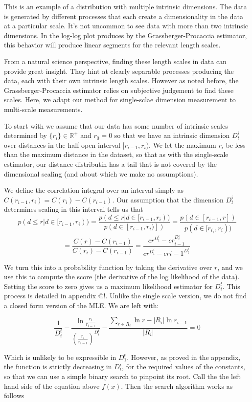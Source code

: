 \documentclass[10pt]{article}
\begin{document}
This is an example of a distribution with multiple intrinsic dimensions. The data is generated by different processes that each create a dimensionality in the data at a particular scale. It's not uncommon to see data with more than two intrinsic dimensions. In the log-log plot produces by the Grassberger-Procaccia estimator, this behavior will produce linear segments for the relevant length scales.

From a natural science perspective, finding these length scales in data can provide great insight. They hint at clearly separable processes producing the data, each with their own intrinsic length scales. However as noted before, the Grassberger-Procaccia estimator relies on subjective judgement to find these scales. Here, we adapt our method for single-sclae dimension measurement to multi-scale measurements.

To start with we assume that our data has some number of intrinsic scales determined by $\{r_i\} \in {\mathbb R}^+$ and $r_0 = 0$ so that we have an intrinsic dimension $D_t^i$ over distances in the half-open interval $[r_{i-1}, r_{i})$. We let the maximum $r_i$ be less than the maximum distance in the dataset, so that as with the single-scale estimator, our distance distributin has a tail that is not covered by the dimensional scaling (and about which we make no assumptions).

We define the correlation integral over an interval simply as $C(r_{i-1}, r_i) = C(r_i) - C(r_{i-1})$. Our assumption that the dimension $D_t^i$ determines scaling in this interval tells us that 
\[
p(d \leq r | d \in [r_{i-1}, r_i)) = \frac{p(d \leq r | d \in [r_{i-1}, r_i))}{p(d \in [r_{i-1}, r_i)])} = \frac{p(d \in [r_{i-1}, r])}{p(d \in [r_{i_1}, r_i))}
\]
\[
 = \frac{C(r) - C(r_{i-1})}{C(r_i) - C(r_{i-1})} = \frac{cr^{D^i_t} - cr_{i-1}^{D^i_t}}{cr^{D^i_t} - cr{i-1}^{D^i_t}}\
\]

We turn this into a probability function by taking the derivative over $r$, and we use this to compute the score (the derivative of the log likelihood of the data). Setting the score to zero gives us a maximum likelihood estimator for $D^t_i$. This process is detailed in appendix @!. Unlike the single scale version, we do not find a closed form version of the MLE. We are left with:

\[
\frac{1}{D^t_i} - \frac{\ln \frac{r_i}{r_{i-1}}}{(\frac{r_i}{r_{i-1}})^{D^t_i}} - \frac{\sum_{r \in R_i}\ln r - |R_i| \ln r_{i-1}}{|R_i|}= 0
\]

Which is unlikely to be expressible in $D^t_1$. However, as proved in the appendix, the function is strictly decreasing in $D^i_t$, for the required values of the constants, so that we can use a simple binary search to pinpoint its root. Call the the left hand side of the equation above $f(x)$. Then the search algorithm works as follows
\end{document}
